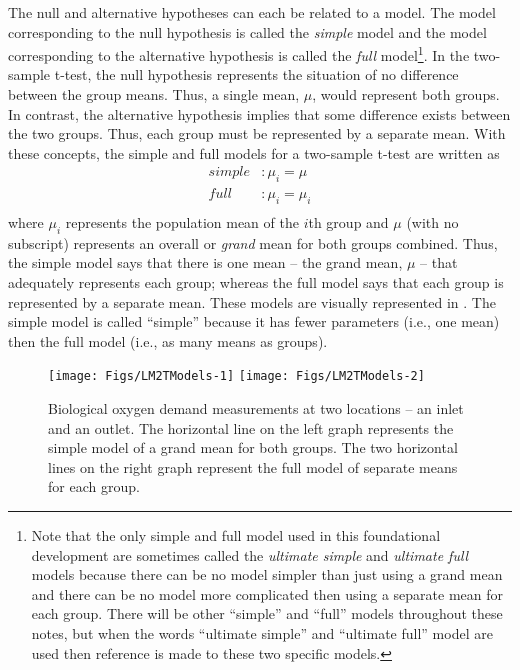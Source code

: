 \documentclass[10pt,openany]{book}\usepackage[]{graphicx}\usepackage[]{color}
\newenvironment{knitrout}{}{} %
\begin{document}
The null and alternative hypotheses can each be related to a model.  The model corresponding to the null hypothesis is called the \emph{simple} model and the model corresponding to the alternative hypothesis is called the \emph{full} model\footnote{Note that the only simple and full model used in this foundational development are sometimes called the \emph{ultimate simple} and \emph{ultimate full} models because there can be no model simpler than just using a grand mean and there can be no model more complicated then using a separate mean for each group.  There will be other ``simple'' and ``full'' models throughout these notes, but when the words ``ultimate simple'' and ``ultimate full'' model are used then reference is made to these two specific models.}.  In the two-sample t-test, the null hypothesis represents the situation of no difference between the group means.  Thus, a single mean, $\mu$, would represent both groups.  In contrast, the alternative hypothesis implies that some difference exists between the two groups.  Thus, each group must be represented by a separate mean.  With these concepts, the simple and full models for a two-sample t-test are written as
\[ \begin{split}
   simple&: \mu_{i} = \mu \\
   full&: \mu_{i} = \mu_{i} \\
\end{split} \]
where $\mu_{i}$ represents the population mean of the $i$th group and $\mu$ (with no subscript) represents an overall or \emph{grand} mean for both groups combined.  Thus, the simple model says that there is one mean -- the grand mean, $\mu$ -- that adequately represents each group; whereas the full model says that each group is represented by a separate mean.  These models are visually represented in .  The simple model is called ``simple'' because it has fewer parameters (i.e., one mean) then the full model (i.e., as many means as groups).

\begin{knitrout}
\color{fgcolor}\begin{figure}[!h]

{\centering \texttt{[image: Figs/LM2TModels-1]} 
\texttt{[image: Figs/LM2TModels-2]} 

}

\caption[Biological oxygen demand measurements at two locations -- an inlet and an outlet]{Biological oxygen demand measurements at two locations -- an inlet and an outlet.  The horizontal line on the left graph represents the simple model of a grand mean for both groups.  The two horizontal lines on the right graph represent the full model of separate means for each group.}\label{fig:LM2TModels}
\end{figure}


\end{knitrout}
\end{document}

